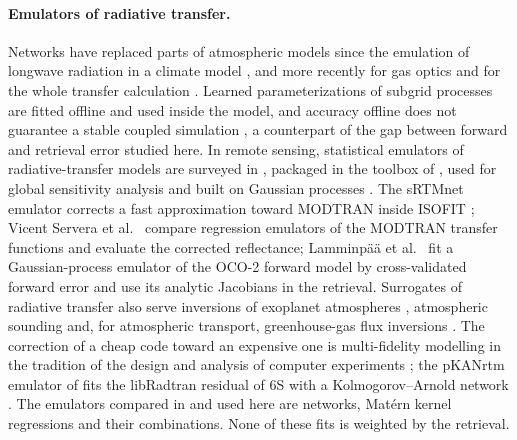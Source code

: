 \documentclass[11pt]{article}
\theoremstyle{remark}
\newcommand{\1}{\mathbf{1}}
\begin{document}
\paragraph{Emulators of radiative transfer.} Networks have replaced parts of atmospheric models since the emulation of
longwave radiation in a climate model \cite{krasnopolsky}, and more recently for gas optics and for the whole transfer
calculation \cite{veerman,ukkonen}. Learned parameterizations of subgrid processes \cite{rasp} are fitted offline and
used inside the model, and accuracy offline does not guarantee a stable coupled simulation \cite{brenowitz}, a
counterpart of the gap between forward and retrieval error studied here. In remote sensing, statistical emulators of radiative-transfer models are surveyed in
\cite{verrelst2025}, packaged in the toolbox of \cite{rivera}, used for global sensitivity analysis \cite{verrelst2015}
and built on Gaussian processes \cite{gomezdans,campsvalls}. The sRTMnet emulator corrects a fast approximation toward
MODTRAN inside ISOFIT \cite{brodrick}; Vicent Servera et al.\ \cite{vicentservera} compare regression emulators of the
MODTRAN transfer functions and evaluate the corrected reflectance; Lamminp\"a\"a et al.\ \cite{lamminpaa} fit a
Gaussian-process emulator of the OCO-2 forward model by cross-validated forward error and use its analytic Jacobians in
the retrieval. Surrogates of radiative transfer also serve inversions of exoplanet atmospheres \cite{himes2022},
atmospheric sounding \cite{sgattoni2024} and, for atmospheric transport, greenhouse-gas flux inversions
\cite{dadheech2025}. The correction of a cheap code toward an expensive one is multi-fidelity modelling
\cite{kennedyohagan,perdikaris,peherstorfer} in the tradition of the design and analysis of computer experiments
\cite{sacks}; the pKANrtm emulator of \cite{pkan} fits the libRadtran residual of 6S with a Kolmogorov--Arnold network
\cite{kan,kolmogorov}. The emulators compared in \cite{shmalo2} and used here are networks, Mat\'ern kernel regressions
\cite{stein,rw} and their combinations. None of these fits is weighted by the retrieval.
\end{document}
